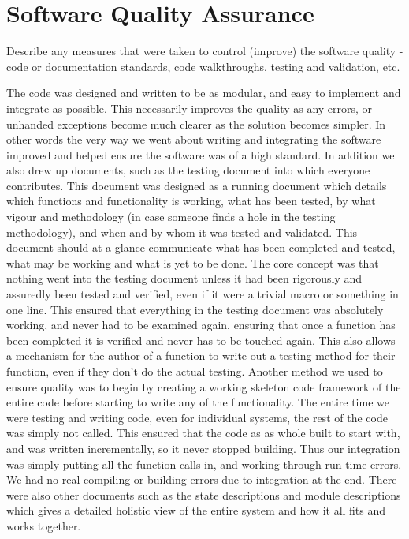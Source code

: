 \documentclass[]{report}
\begin{document}
\section{Software Quality Assurance}
Describe any measures that were taken to control (improve) the software quality - code or documentation standards, code walkthroughs, testing and validation, etc.

The code was designed and written to be as modular, and easy to implement and integrate as possible. This necessarily improves the quality as any errors, or unhanded exceptions become much clearer as the solution becomes simpler. In other words the very way we went about writing and integrating the software improved and helped ensure the software was of a high standard. \newline
In addition we also drew up documents, such as the testing document into which everyone contributes. This document was designed as a running document which details which functions and functionality is working, what has been tested, by what vigour and methodology (in case someone finds a hole in the testing methodology), and when and by whom it was tested and validated. This document should at a glance communicate what has been completed and tested, what may be working and what is yet to be done. The core concept was that nothing went into the testing document unless it had been rigorously and assuredly been tested and verified, even if it were a trivial macro or something in one line. This ensured that everything in the testing document was absolutely working, and never had to be examined again, ensuring that once a function has been completed it is verified and never has to be touched again. This also allows a mechanism for the author of a function to write out a testing method for their function, even if they don't do the actual testing. \newline
Another method we used to ensure quality was to begin by creating a working skeleton code framework of the entire code before starting to write any of the functionality. The entire time we were testing and writing code, even for individual systems, the rest of the code was simply not called. This ensured that the code as as whole built to start with, and was written incrementally, so it never stopped building. Thus our integration was simply putting all the function calls in, and working through run time errors. We had no real compiling or building errors due to integration at the end.\newline
There were also other documents such as the state descriptions and module descriptions which gives a detailed holistic view of the entire system and how it all fits and works together.
\end{document}
